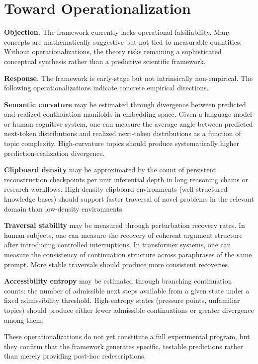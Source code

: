 \documentclass[12pt,oneside]{book}
\theoremstyle{plain}
\theoremstyle{definition}
\theoremstyle{plain}
\begin{document}
\section{Toward Operationalization}

\textbf{Objection.} The framework currently lacks operational falsifiability. Many concepts are mathematically suggestive but not tied to measurable quantities. Without operationalizations, the theory risks remaining a sophisticated conceptual synthesis rather than a predictive scientific framework.

\textbf{Response.} The framework is early-stage but not intrinsically non-empirical. The following operationalizations indicate concrete empirical directions.

\textbf{Semantic curvature} may be estimated through divergence between predicted and realized continuation manifolds in embedding space. Given a language model or human cognitive system, one can measure the average angle between predicted next-token distributions and realized next-token distributions as a function of topic complexity. High-curvature topics should produce systematically higher prediction-realization divergence.

\textbf{Clipboard density} may be approximated by the count of persistent reconstruction checkpoints per unit inferential depth in long reasoning chains or research workflows. High-density clipboard environments (well-structured knowledge bases) should support faster traversal of novel problems in the relevant domain than low-density environments.

\textbf{Traversal stability} may be measured through perturbation recovery rates. In human subjects, one can measure the recovery of coherent argument structure after introducing controlled interruptions. In transformer systems, one can measure the consistency of continuation structure across paraphrases of the same prompt. More stable traversals should produce more consistent recoveries.

\textbf{Accessibility entropy} may be estimated through branching continuation counts: the number of admissible next steps available from a given state under a fixed admissibility threshold. High-entropy states (pressure points, unfamiliar topics) should produce either fewer admissible continuations or greater divergence among them.

These operationalizations do not yet constitute a full experimental program, but they confirm that the framework generates specific, testable predictions rather than merely providing post-hoc redescriptions.
\end{document}

